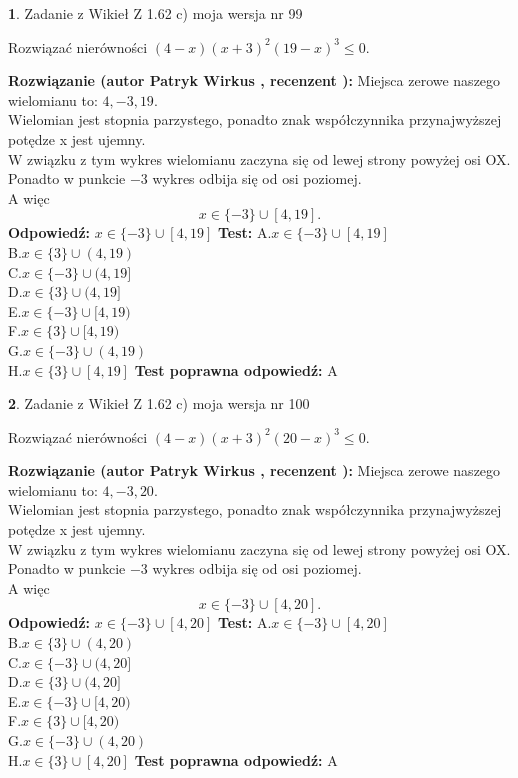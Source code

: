 \documentclass[12pt, a4paper]{article}
\theoremstyle{definition} %
\newtheorem{zad}{}
\newcommand{\zadStart}[1]{\begin{zad}#1\newline}
\newcommand{\zadStop}{\end{zad}}
\newcommand{\rozwStart}[2]{\noindent \textbf{Rozwiązanie (autor #1 , recenzent #2): }\newline}
\newcommand{\rozwStop}{\newline}
\newcommand{\odpStart}{\noindent \textbf{Odpowiedź:}\newline}
\newcommand{\odpStop}{\newline}
\newcommand{\testStart}{\noindent \textbf{Test:}\newline}
\newcommand{\testStop}{\newline}
\newcommand{\kluczStart}{\noindent \textbf{Test poprawna odpowiedź:}\newline}
\newcommand{\kluczStop}{\newline}
\begin{document}
\zadStart{Zadanie z Wikieł Z 1.62 c) moja wersja nr 99}

Rozwiązać nierówności $(4-x)(x+3)^{2}(19-x)^{3}\le0$.
\zadStop
\rozwStart{Patryk Wirkus}{}
Miejsca zerowe naszego wielomianu to: $4, -3, 19$.\\
Wielomian jest stopnia parzystego, ponadto znak współczynnika przy\linebreak najwyższej potędze x jest ujemny.\\ W związku z tym wykres wielomianu zaczyna się od lewej strony powyżej osi OX.\\
Ponadto w punkcie $-3$ wykres odbija się od osi poziomej.\\
A więc $$x \in \{-3\} \cup [4,19].$$
\rozwStop
\odpStart
$x \in \{-3\} \cup [4,19]$
\odpStop
\testStart
A.$x \in \{-3\} \cup [4,19]$\\
B.$x \in \{3\} \cup (4,19)$\\
C.$x \in \{-3\} \cup (4,19]$\\
D.$x \in \{3\} \cup (4,19]$\\
E.$x \in \{-3\} \cup [4,19)$\\
F.$x \in \{3\} \cup [4,19)$\\
G.$x \in \{-3\} \cup (4,19)$\\
H.$x \in \{3\} \cup [4,19]$
\testStop
\kluczStart
A
\kluczStop



\zadStart{Zadanie z Wikieł Z 1.62 c) moja wersja nr 100}

Rozwiązać nierówności $(4-x)(x+3)^{2}(20-x)^{3}\le0$.
\zadStop
\rozwStart{Patryk Wirkus}{}
Miejsca zerowe naszego wielomianu to: $4, -3, 20$.\\
Wielomian jest stopnia parzystego, ponadto znak współczynnika przy\linebreak najwyższej potędze x jest ujemny.\\ W związku z tym wykres wielomianu zaczyna się od lewej strony powyżej osi OX.\\
Ponadto w punkcie $-3$ wykres odbija się od osi poziomej.\\
A więc $$x \in \{-3\} \cup [4,20].$$
\rozwStop
\odpStart
$x \in \{-3\} \cup [4,20]$
\odpStop
\testStart
A.$x \in \{-3\} \cup [4,20]$\\
B.$x \in \{3\} \cup (4,20)$\\
C.$x \in \{-3\} \cup (4,20]$\\
D.$x \in \{3\} \cup (4,20]$\\
E.$x \in \{-3\} \cup [4,20)$\\
F.$x \in \{3\} \cup [4,20)$\\
G.$x \in \{-3\} \cup (4,20)$\\
H.$x \in \{3\} \cup [4,20]$
\testStop
\kluczStart
A
\kluczStop
\end{document}
